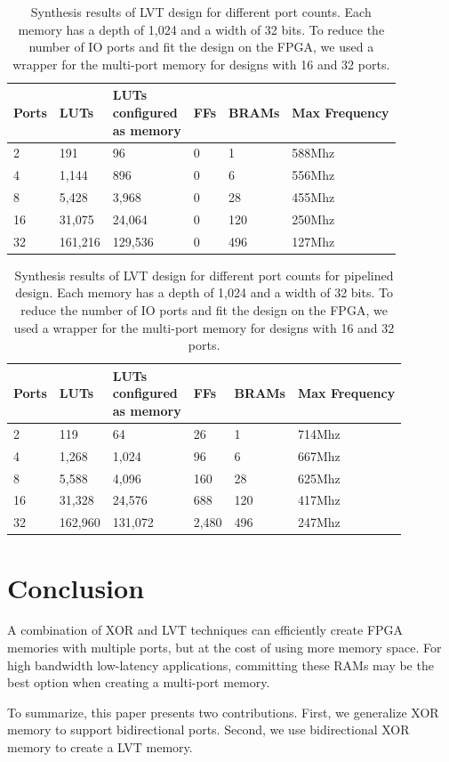 \documentclass[sigconf,nonacm]{acmart}
\begin{document}
\begin{table}
  \caption{Synthesis results of LVT design for different port counts. Each memory has a depth of 1,024 and a width of 32 bits. To reduce the number of IO ports and fit the design on the FPGA, we used a wrapper for the multi-port memory for designs with 16 and 32 ports.}
  \label{tab:syn}
  \begin{tabular}{llllll}
    \toprule
    Ports & LUTs & \thead{LUTs\\ configured\\ as memory} & FFs & BRAMs & Max Frequency\\
    \midrule
    2 & 191 & 96 & 0 & 1 & 588Mhz\\
    4 & 1,144 & 896 & 0 & 6 & 556Mhz\\
    8 & 5,428 & 3,968 & 0 & 28 & 455Mhz\\
    16 & 31,075 & 24,064 & 0 & 120 & 250Mhz\\
    32 & 161,216 & 129,536 & 0 & 496 & 127Mhz\\
    \bottomrule
  \end{tabular}
\end{table}

\begin{table}
  \caption{Synthesis results of LVT design for different port counts for pipelined design. Each memory has a depth of 1,024 and a width of 32 bits. To reduce the number of IO ports and fit the design on the FPGA, we used a wrapper for the multi-port memory for designs with 16 and 32 ports.}
  \label{tab:syn_pipelined}
  \begin{tabular}{llllll}
    \toprule
    Ports & LUTs & \thead{LUTs\\ configured\\ as memory} & FFs & BRAMs & Max Frequency\\
    \midrule
    2 & 119 & 64 & 26 & 1 & 714Mhz\\
    4 & 1,268 & 1,024 & 96 & 6 & 667Mhz\\
    8 & 5,588 & 4,096 & 160 & 28 & 625Mhz\\
    16 & 31,328 & 24,576 & 688 & 120 & 417Mhz\\
    32 & 162,960 & 131,072 & 2,480 & 496 & 247Mhz\\
    \bottomrule
  \end{tabular}
\end{table}
\section{Conclusion}
A combination of XOR and LVT techniques can efficiently create FPGA memories with multiple ports, but at the cost of using more memory space. For high bandwidth low-latency applications, committing these RAMs may be the best option when creating a multi-port memory.

To summarize, this paper presents two contributions. First, we generalize XOR memory to support bidirectional ports. Second, we use bidirectional XOR memory to create a LVT memory.



\end{document}
